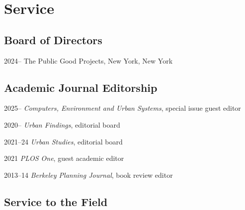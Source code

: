 \documentclass[11pt,letterpaper]{report} %
\begin{document}
    \section*{Service}

   \subsection*{Board of Directors}

   \begin{tablist}

       \item[2024--]    \tab{}The Public Good Projects, New York, New York

   \end{tablist}

    \subsection*{Academic Journal Editorship}

    \begin{tablist}

        \item[2025--]   \tab{}\textit{Computers, Environment and Urban Systems}, special issue guest editor
        \item[2020--]   \tab{}\textit{Urban Findings}, editorial board
        \item[2021--24] \tab{}\textit{Urban Studies}, editorial board
        \item[2021]     \tab{}\textit{PLOS One}, guest academic editor
        \item[2013--14] \tab{}\textit{Berkeley Planning Journal}, book review editor

    \end{tablist}

    \subsection*{Service to the Field}
\end{document}

